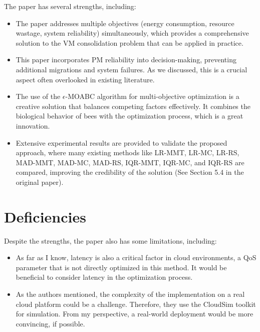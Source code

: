 \documentclass[UTF8, fontset=windows]{article}
\begin{document}
The paper has several strengths, including:

\begin{itemize}
  \item The paper addresses multiple objectives (energy consumption, resource wastage, system reliability) simultaneously, which provides a comprehensive solution to the VM consolidation problem that can be applied in practice.
  \item This paper incorporates PM reliability into decision-making, preventing additional migrations and system failures. As we discussed, this is a crucial aspect often overlooked in existing literature.
  \item The use of the $\epsilon$-MOABC algorithm for multi-objective optimization is a creative solution that balances competing factors effectively. It combines the biological behavior of bees with the optimization process, which is a great innovation.
  \item Extensive experimental results are provided to validate the proposed approach, where many existing methods like LR-MMT, LR-MC, LR-RS, MAD-MMT, MAD-MC, MAD-RS, IQR-MMT, IQR-MC, and IQR-RS are compared, improving the credibility of the solution (See Section 5.4 in the original paper).
\end{itemize}

\section{Deficiencies}

Despite the strengths, the paper also has some limitations, including:

\begin{itemize}
  \item As far as I know, latency is also a critical factor in cloud environments, a QoS parameter that is not directly optimized in this method. It would be beneficial to consider latency in the optimization process.
  \item As the authors mentioned, the complexity of the implementation on a real cloud platform could be a challenge. Therefore, they use the CloudSim toolkit for simulation. From my perspective, a real-world deployment would be more convincing, if possible.
\end{itemize}
\end{document}

